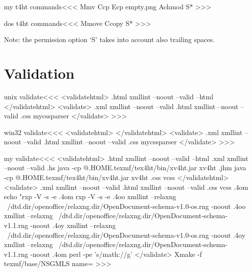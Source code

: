 \documentclass{article}
\begin{document}
\<my t4ht commands\><<<
Mmv %
Ccp %
Ecp empty.png %
Achmod %
S*
>>>

\<dos t4ht commands\><<<
Mmove %
Ccopy %
S*
>>>

Note: the permission option `S' takes into account also trailing spaces.


\section{Validation}



\<unix validate\><<<
<validatehtml>
 .html xmllint --noout --valid --html %
</validatehtml>
<validate>
 .xml xmllint --noout --valid %
 .html xmllint --noout --valid %
 .css mycssparser %
</validate>
>>>



\<win32 validate\><<<
<validatehtml>
</validatehtml>
<validate>
 .xml xmllint --noout --valid %
 .html xmllint --noout --valid %
 .css mycssparser %
</validate>
>>>






\def\.#1.{\csname #1\endcsname}


\<my validate\><<<
<validatehtml>
.html xmllint --noout --valid --html %
.xml xmllint --noout --valid %
 .hs java -cp @.HOME.texmf/tex4ht/bin/xv4ht.jar xv4ht %
 .jhm java -cp @.HOME.texmf/tex4ht/bin/xv4ht.jar xv4ht %
.css vcss %
</validatehtml>
<validate>
.xml xmllint --noout --valid %
.html xmllint --noout --valid %
.css vcss %
 .4om echo "rxp -V -s -e %
 .4om rxp -V -s -e %
 .4oo xmllint --relaxng ~/dtd.dir/openoffice/relaxng.dir/OpenDocument-schema-v1.0-os.rng -noout %
.4oo xmllint --relaxng  ~/dtd.dir/openoffice/relaxng.dir/OpenDocument-schema-v1.1.rng -noout %
 .4oy xmllint --relaxng ~/dtd.dir/openoffice/relaxng.dir/OpenDocument-schema-v1.0-os.rng -noout %
.4oy xmllint --relaxng  ~/dtd.dir/openoffice/relaxng.dir/OpenDocument-schema-v1.1.rng -noout %
.4om perl -pe 's/math://g' %
</validate>
 Xmake -f \HOME texmf/base/NSGMLS name=%
>>>
\end{document}
